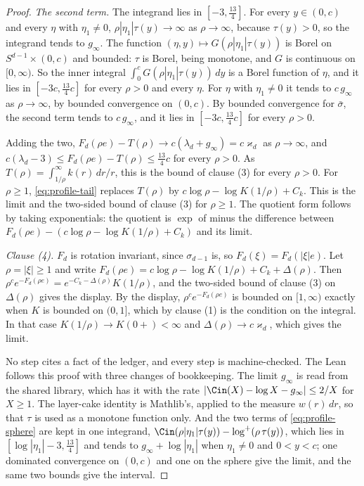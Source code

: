 \begin{proof}
\emph{The second term.} The integrand lies in $[-3, \tfrac{13}{4}]$. For every $y \in (0,c)$ and
every $\eta$ with $\eta_1 \ne 0$, $\rho|\eta_1|\tau(y) \to \infty$ as $\rho \to \infty$, because
$\tau(y) > 0$, so the integrand tends to $g_\infty$. The function
$(\eta,y) \mapsto G(\rho|\eta_1|\tau(y))$ is Borel on $S^{d-1} \times (0,c)$ and bounded: $\tau$
is Borel, being monotone, and $G$ is continuous on $[0,\infty)$. So the inner integral
$\int_0^c G(\rho|\eta_1|\tau(y))\,dy$ is a Borel function of $\eta$, and it lies in
$[-3c, \tfrac{13}{4}c]$ for every $\rho > 0$ and every $\eta$. For $\eta$ with $\eta_1 \ne 0$ it
tends to $c\,g_\infty$ as $\rho \to \infty$, by bounded convergence on $(0,c)$. By bounded
convergence for $\bar\sigma$, the second term tends to $c\,g_\infty$, and it lies in
$[-3c, \tfrac{13}{4}c]$ for every $\rho > 0$.

Adding the two, $F_d(\rho e) - T(\rho) \to c(\lambda_d + g_\infty) = c\varkappa_d$ as
$\rho \to \infty$, and $c(\lambda_d - 3) \le F_d(\rho e) - T(\rho) \le \tfrac{13}{4}c$ for every
$\rho > 0$. As $T(\rho) = \int_{1/\rho}^\infty k(r)\,dr/r$, this is the bound of clause (3) for
every $\rho > 0$. For $\rho \ge 1$, \ref{eq:profile-tail} replaces $T(\rho)$ by
$c\log\rho - \log K(1/\rho) + C_k$. This is the limit and the two-sided bound of clause (3) for
$\rho \ge 1$. The
quotient form follows by taking exponentials: the quotient is $\exp$ of minus the difference
between $F_d(\rho e) - (c\log\rho - \log K(1/\rho) + C_k)$ and its limit.

\emph{Clause (4).} $F_d$ is rotation invariant, since $\sigma_{d-1}$ is, so
$F_d(\xi) = F_d(|\xi|e)$. Let $\rho = |\xi| \ge 1$ and write
$F_d(\rho e) = c\log\rho - \log K(1/\rho) + C_k + \Delta(\rho)$. Then
$\rho^{c}e^{-F_d(\rho e)} = e^{-C_k - \Delta(\rho)}K(1/\rho)$, and the two-sided bound of clause
(3) on $\Delta(\rho)$ gives the display. By the display, $\rho^{c}e^{-F_d(\rho e)}$ is bounded on
$[1,\infty)$ exactly when $K$ is bounded on $(0,1]$, which by clause (1) is the condition on the
integral. In that case $K(1/\rho) \to K(0{+}) < \infty$ and $\Delta(\rho) \to c\varkappa_d$, which
gives the limit.

No step cites a fact of the ledger, and every step is machine-checked. The Lean follows this
proof with three changes of bookkeeping. The limit $g_\infty$ is read from the shared library,
which has it with the rate $|\Cin(X) - \log X - g_\infty| \le 2/X$ for $X \ge 1$. The layer-cake
identity is Mathlib's, applied to the measure $w(r)\,dr$, so that $\tau$ is used as a monotone
function only. And the two terms of \ref{eq:profile-sphere} are kept in one integrand,
$\Cin(\rho|\eta_1|\tau(y)) - \log^+(\rho\,\tau(y))$, which lies in
$[\log|\eta_1| - 3, \tfrac{13}{4}]$ and tends to $g_\infty + \log|\eta_1|$ when $\eta_1 \ne 0$
and $0 < y < c$; one dominated convergence on $(0,c)$ and one on the sphere give the limit, and
the same two bounds give the interval.
\end{proof}

